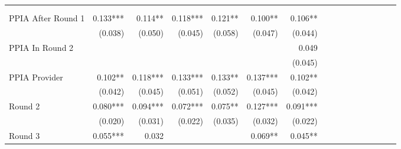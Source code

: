 \begin{tabular}{@{\extracolsep{5pt}}lrrrrrrrrrrrrrrr}
\toprule
& \multicolumn{1}{p{0.13\linewidth}}{\centering{(1)}} & \multicolumn{1}{p{0.13\linewidth}}{\centering{(2)}} & \multicolumn{1}{p{0.13\linewidth}}{\centering{(3)}} & \multicolumn{1}{p{0.13\linewidth}}{\centering{(4)}} & \multicolumn{1}{p{0.13\linewidth}}{\centering{(5)}} & \multicolumn{1}{p{0.13\linewidth}}{\centering{(6)}} \\
& \multicolumn{1}{p{0.13\linewidth}}{\centering{Pooled Model}} & \multicolumn{1}{p{0.13\linewidth}}{\centering{Sample 1a Pooled}} & \multicolumn{1}{p{0.13\linewidth}}{\centering{Diff$-$Diff Model}} & \multicolumn{1}{p{0.13\linewidth}}{\centering{Sample 1a Diff$-$Diff}} & \multicolumn{1}{p{0.13\linewidth}}{\centering{Restricted Sample}} & \multicolumn{1}{p{0.13\linewidth}}{\centering{Separate Effects}} \\
\hline
PPIA After Round 1 & 0.133\phantom{)}*** & 0.114\phantom{)}**\phantom{*} & 0.118\phantom{)}*** & 0.121\phantom{)}**\phantom{*} & 0.100\phantom{)}**\phantom{*} & 0.106\phantom{)}**\phantom{*} \\
& (0.038)\phantom{***} & (0.050)\phantom{***} & (0.045)\phantom{***} & (0.058)\phantom{***} & (0.047)\phantom{***} & (0.044)\phantom{***} \\
PPIA In Round 2 & \phantom{***} & \phantom{***} & \phantom{***} & \phantom{***} & \phantom{***} & 0.049\phantom{\phantom{)}***} \\
& \phantom{***} & \phantom{***} & \phantom{***} & \phantom{***} & \phantom{***} & (0.045)\phantom{***} \\
PPIA Provider & 0.102\phantom{)}**\phantom{*} & 0.118\phantom{)}*** & 0.133\phantom{)}*** & 0.133\phantom{)}**\phantom{*} & 0.137\phantom{)}*** & 0.102\phantom{)}**\phantom{*} \\
& (0.042)\phantom{***} & (0.045)\phantom{***} & (0.051)\phantom{***} & (0.052)\phantom{***} & (0.045)\phantom{***} & (0.042)\phantom{***} \\
Round 2 & 0.080\phantom{)}*** & 0.094\phantom{)}*** & 0.072\phantom{)}*** & 0.075\phantom{)}**\phantom{*} & 0.127\phantom{)}*** & 0.091\phantom{)}*** \\
& (0.020)\phantom{***} & (0.031)\phantom{***} & (0.022)\phantom{***} & (0.035)\phantom{***} & (0.032)\phantom{***} & (0.022)\phantom{***} \\
Round 3 & 0.055\phantom{)}*** & 0.032\phantom{\phantom{)}***} & \phantom{***} & \phantom{***} & 0.069\phantom{)}**\phantom{*} & 0.045\phantom{)}**\phantom{*} \\

\end{tabular}

